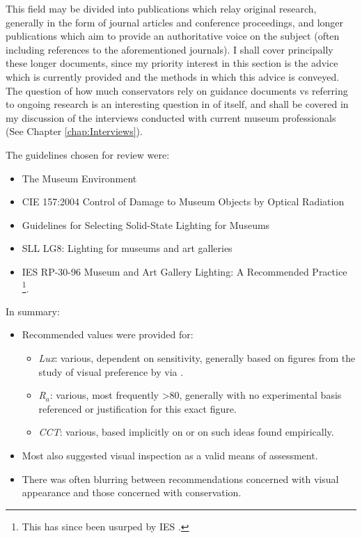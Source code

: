 This field may be divided into publications which relay original research, generally in the form of journal articles and conference proceedings, and longer publications which aim to provide an authoritative voice on the subject (often including references to the aforementioned journals). I shall cover principally these longer documents, since my priority interest in this section is the advice which is currently provided and the methods in which this advice is conveyed. The question of how much conservators rely on guidance documents vs referring to ongoing research is an interesting question in of itself, and shall be covered in my discussion of the interviews conducted with current museum professionals (See Chapter \ref{chap:Interviews}).

\noindent
The guidelines chosen for review were:
\begin{itemize}
\item The Museum Environment \citep{thomson_museum_1986}
\item \gls{CIE} 157:2004 Control of Damage to Museum Objects by Optical Radiation \citep{cie_cie_2004}
\item Guidelines for Selecting Solid-State Lighting for Museums \citep{druzik_guidelines_2012}
\item SLL LG8: Lighting for museums and art galleries \citep{cibse_lighting_2015}
\item IES RP-30-96 Museum and Art Gallery Lighting: A Recommended Practice \citep{ies_ies_1996}\footnote{This has since been usurped by IES \citep{ies_ansi/ies_2017}.}.
\end{itemize}

\noindent
In summary:
\begin{itemize}
\item Recommended values were provided for:
\begin{itemize}
\item \emph{Lux}: various, dependent on sensitivity, generally based on figures from the study of visual preference by \citet{loe_preferred_1982} via \citet{thomson_museum_1978}.
\item \emph{R$_a$}: various, most frequently \textgreater 80, generally with no experimental basis referenced or justification for this exact figure.
\item \emph{\gls{CCT}}: various, based implicitly on \citet{kruithof_tubular_1941} or on such ideas found empirically.
\end{itemize}
\item Most also suggested visual inspection as a valid means of assessment.
\item There was often blurring between recommendations concerned with visual appearance and those concerned with conservation. 
\end{itemize}

